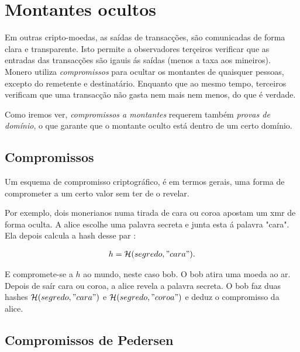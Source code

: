 \chapter{Montantes ocultos}
\label{chapter:pedersen-commitments}

Em outras cripto-moedas, as saídas de transacções, são comunicadas de forma clara e transparente. Isto permite a observadores terçeiros verificar que as entradas das transacções são igauis ás saídas (menos a taxa aos mineiros). Monero utiliza {\em compromissos} para ocultar os montantes de quaisquer pessoas, excepto do remetente e destinatário. Enquanto que ao mesmo tempo, terceiros verificam que uma transacção não gasta nem mais nem menos, do que é verdade. 

Como iremos ver, {\em compromissos a montantes} requerem também {\em provas de domínio}, o que garante que o montante oculto está dentro de um certo domínio.

\section{Compromissos}
\label{sec:commitments}

Um esquema de compromisso criptográfico, é em termos gerais, uma forma de comprometer a um certo valor sem ter de o revelar. 

Por exemplo, dois monerianos numa tirada de cara ou coroa apostam um xmr de forma oculta. A alice escolhe uma palavra secreta e junta esta á palavra "cara". Ela depois calcula a hash desse par :

\begin{align*}
h= \mathcal{H}(segredo, "cara").
\end{align*}

E compromete-se a $h$ ao mundo, neste caso bob. O bob atira uma moeda ao ar. Depois de saír cara ou coroa, a alice revela a palavra secreta. O bob faz duas hashes $\mathcal{H}(segredo, "cara")$ e $\mathcal{H}(segredo, "coroa")$ e deduz o compromisso da alice.
\section{Compromissos de Pedersen}
\label{pedersen_section}

